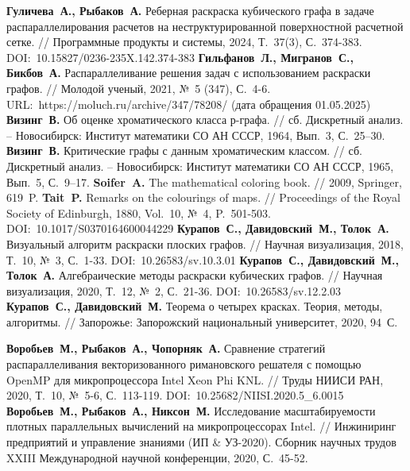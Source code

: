 \begin{thebibliography}{99}
\textbf{Гуличева~А., Рыбаков~А.} Реберная раскраска кубического графа в задаче распараллелирования расчетов на неструктурированной поверхностной расчетной сетке. // Программные продукты и системы, 2024, Т.~37(3), С.~374-383. DOI:~10.15827/0236-235X.142.374-383
\textbf{Гильфанов~Л., Мигранов~С., Бикбов~А.} Распараллеливание решения задач с использованием раскраски графов. // Молодой ученый, 2021, №~5 (347), С.~4-6. URL:~https://moluch.ru/archive/347/78208/ (дата обращения 01.05.2025)
\textbf{Визинг~В.} Об оценке хроматического класса р-графа. // сб. Дискретный анализ. -- Новосибирск: Институт математики СО АН СССР, 1964, Вып.~3, С.~25–30.
\textbf{Визинг~В.} Критические графы с данным хроматическим классом. // сб. Дискретный анализ. -- Новосибирск: Институт математики СО АН СССР, 1965, Вып.~5, С.~9–17.
\textbf{Soifer~A.} The mathematical coloring book. // 2009, Springer, 619~P.
\textbf{Tait~P.} Remarks on the colourings of maps. // Proceedings of the Royal Society of Edinburgh, 1880, Vol.~10, №~4, P.~501-503. DOI:~10.1017/S0370164600044229
\textbf{Курапов~С., Давидовский~М., Толок~А.} Визуальный алгоритм раскраски плоских графов. // Научная визуализация, 2018, Т.~10, №~3, С.~1-33. DOI:~10.26583/sv.10.3.01
\textbf{Курапов~С., Давидовский~М., Толок~А.} Алгебраические методы раскраски кубических графов. // Научная визуализация, 2020, Т.~12, №~2, С.~21-36. DOI:~10.26583/sv.12.2.03
\textbf{Курапов~С., Давидовский~М.} Теорема о четырех красках. Теория, методы, алгоритмы. // Запорожье: Запорожский национальный университет, 2020, 94~С.

\textbf{Воробьев~М., Рыбаков~А., Чопорняк~А.} Сравнение стратегий распараллеливания векторизованного римановского решателя с помощью OpenMP для микропроцессора Intel Xeon Phi KNL. // Труды НИИСИ РАН, 2020, Т.~10, №~5-6, С.~113-119. DOI:~10.25682/NIISI.2020.5\_6.0015
\textbf{Воробьев~М., Рыбаков~А., Никсон~М.} Исследование масштабируемости плотных параллельных вычислений на микропроцессорах Intel. // Инжиниринг предприятий и управление знаниями (ИП \& УЗ-2020). Сборник научных трудов XXIII Международной научной конференции, 2020, С.~45-52.



\end{thebibliography}
